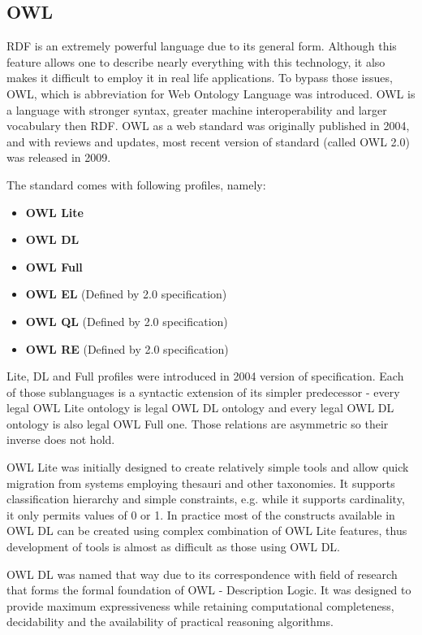 \subsection{OWL}

RDF is an extremely powerful language due to its general form. Although this feature allows one to describe nearly everything with this technology, it also makes it difficult to employ it in real life applications. To bypass those issues, OWL, which is abbreviation for Web Ontology Language was introduced. OWL is a language with stronger syntax, greater machine interoperability and larger vocabulary then RDF.
OWL as a web standard was originally published in 2004, and with reviews and updates, most recent version of standard (called OWL 2.0) was released in 2009\cite{owlRef:2009, owlPrimer:2009}.

The standard comes with following profiles, namely:

\begin{itemize}
	\item{ {\bf OWL Lite}}
	\item{ {\bf OWL DL}}
	\item{ {\bf OWL Full}}
	\item{ {\bf OWL EL} (Defined by 2.0 specification)}
	\item{ {\bf OWL QL} (Defined by 2.0 specification)}
	\item{ {\bf OWL RE} (Defined by 2.0 specification)}
\end{itemize}

Lite, DL and Full profiles were introduced in 2004 version of specification. Each of those sublanguages is a syntactic extension of its simpler predecessor - every legal OWL Lite ontology is legal OWL DL ontology and every legal OWL DL ontology is also legal OWL Full one. Those relations are asymmetric so their inverse does not hold. 

OWL Lite was initially designed to create relatively simple tools and allow quick migration from systems employing thesauri and other taxonomies. It supports classification hierarchy and simple constraints, e.g. while it supports cardinality, it only permits values of 0 or 1. In practice most of the constructs available in OWL DL can be created using complex combination of OWL Lite features, thus development of tools is almost as difficult as those using OWL DL. 

OWL DL was named that way due to its correspondence with field of research that forms the formal foundation of OWL - Description Logic. It was designed to provide maximum expressiveness while retaining computational completeness, decidability and the availability of practical reasoning algorithms. 

